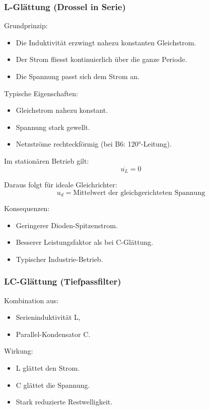 \subsubsection{L-Glättung (Drossel in Serie)}

Grundprinzip:
\begin{itemize}
\item Die Induktivität erzwingt nahezu konstanten Gleichstrom.
\item Der Strom fliesst kontinuierlich über die ganze Periode.
\item Die Spannung passt sich dem Strom an.
\end{itemize}

Typische Eigenschaften:
\begin{itemize}
\item Gleichstrom nahezu konstant.
\item Spannung stark gewellt.
\item Netzströme rechteckförmig (bei B6: 120°-Leitung).
\end{itemize}

Im stationären Betrieb gilt:
\[
\boxed{\overline{u_L} = 0}
\]

Daraus folgt für ideale Gleichrichter:
\[
\boxed{u_d = \text{Mittelwert der gleichgerichteten Spannung}}
\]

Konsequenzen:
\begin{itemize}
\item Geringerer Dioden-Spitzenstrom.
\item Besserer Leistungsfaktor als bei C-Glättung.
\item Typischer Industrie-Betrieb.
\end{itemize}

\subsubsection{LC-Glättung (Tiefpassfilter)}

Kombination aus:
\begin{itemize}
\item Serieninduktivität L,
\item Parallel-Kondensator C.
\end{itemize}

Wirkung:
\begin{itemize}
\item L glättet den Strom.
\item C glättet die Spannung.
\item Stark reduzierte Restwelligkeit.
\end{itemize}

